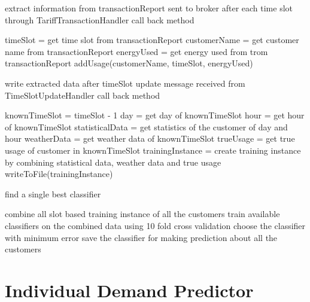\begin{algorithm}[!h]
\caption{extract information from transactionReport sent to broker after each time slot through TariffTransactionHandler call back method}
\begin{algorithmic} [1]
\STATE timeSlot = get time slot from transactionReport
\STATE customerName = get customer name from transactionReport
\STATE energyUsed = get energy used from trom transactionReport
\STATE addUsage(customerName, timeSlot, energyUsed)
\end{algorithmic}
 \label{alg:ttxHandle}
\end{algorithm}

\begin{algorithm} [!h]
\caption{write extracted data after timeSlot update message received from TimeSlotUpdateHandler call back method}
\begin{algorithmic} [1]
\STATE knownTimeSlot = timeSlot - 1
\STATE day = get day of knownTimeSlot
\STATE hour = get hour of knownTimeSlot
\STATE statisticalData = get statistics of the customer of day and hour
\STATE weatherData = get weather data of knownTimeSlot
\STATE trueUsage = get true usage of customer in knownTimeSlot
\STATE trainingInstance = create training instance by combining statistical data, weather data and true usage 
\STATE writeToFile(trainingInstance)
\ENDFOR
\end{algorithmic}
\label{alg:writeSlotInfo}
\end{algorithm}

\begin{algorithm}[!h]
\caption{find a single best classifier}
\begin{algorithmic} [1]
\STATE combine all slot based training instance of all the customers
\STATE train available classifiers on the combined data using 10 fold cross validation
\STATE choose the classifier with minimum error
\STATE save the classifier for making prediction about all the customers
\end{algorithmic}
\label{alg:bestSingle}
\end{algorithm}

\section{Individual Demand Predictor}

